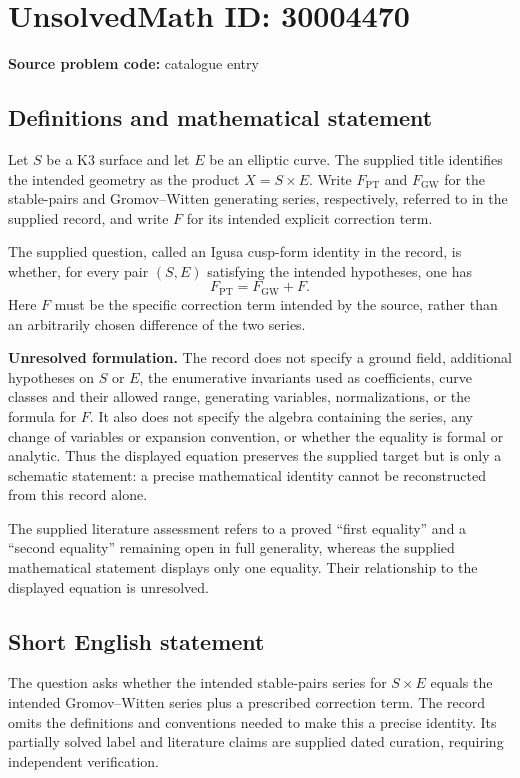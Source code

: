 \documentclass[11pt]{article}
\begin{document}
\section*{UnsolvedMath ID: 30004470}
\textbf{Source problem code:} catalogue entry
\subsection{Definitions and mathematical statement}
Let \(S\) be a K3 surface and let \(E\) be an elliptic curve. The supplied title identifies the intended geometry as the product \(X=S\times E\). Write \(F_{\mathrm{PT}}\) and \(F_{\mathrm{GW}}\) for the stable-pairs and Gromov--Witten generating series, respectively, referred to in the supplied record, and write \(F\) for its intended explicit correction term.

The supplied question, called an Igusa cusp-form identity in the record, is whether, for every pair \((S,E)\) satisfying the intended hypotheses, one has
\[
F_{\mathrm{PT}}=F_{\mathrm{GW}}+F.
\]
Here \(F\) must be the specific correction term intended by the source, rather than an arbitrarily chosen difference of the two series.

\textbf{Unresolved formulation.} The record does not specify a ground field, additional hypotheses on \(S\) or \(E\), the enumerative invariants used as coefficients, curve classes and their allowed range, generating variables, normalizations, or the formula for \(F\). It also does not specify the algebra containing the series, any change of variables or expansion convention, or whether the equality is formal or analytic. Thus the displayed equation preserves the supplied target but is only a schematic statement: a precise mathematical identity cannot be reconstructed from this record alone.

The supplied literature assessment refers to a proved ``first equality'' and a ``second equality'' remaining open in full generality, whereas the supplied mathematical statement displays only one equality. Their relationship to the displayed equation is unresolved.
\subsection{Short English statement}
The question asks whether the intended stable-pairs series for \(S\times E\) equals the intended Gromov--Witten series plus a prescribed correction term. The record omits the definitions and conventions needed to make this a precise identity. Its partially solved label and literature claims are supplied dated curation, requiring independent verification.
\end{document}
